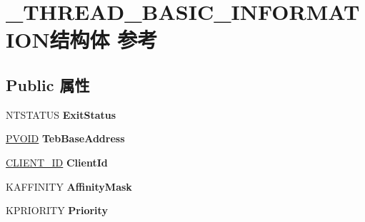 \hypertarget{struct___t_h_r_e_a_d___b_a_s_i_c___i_n_f_o_r_m_a_t_i_o_n}{}\section{\+\_\+\+T\+H\+R\+E\+A\+D\+\_\+\+B\+A\+S\+I\+C\+\_\+\+I\+N\+F\+O\+R\+M\+A\+T\+I\+O\+N结构体 参考}
\label{struct___t_h_r_e_a_d___b_a_s_i_c___i_n_f_o_r_m_a_t_i_o_n}
\subsection*{Public 属性}
\begin{DoxyCompactItemize}
\item 
\mbox{\label{struct___t_h_r_e_a_d___b_a_s_i_c___i_n_f_o_r_m_a_t_i_o_n_a5ef156ce899bb6e306df9f0d38ca80d8}} 
N\+T\+S\+T\+A\+T\+US {\bfseries Exit\+Status}
\item 
\mbox{\label{struct___t_h_r_e_a_d___b_a_s_i_c___i_n_f_o_r_m_a_t_i_o_n_ac16de6379ebcb91729d12edc669e383f}} 
\hyperlink{interfacevoid}{P\+V\+O\+ID} {\bfseries Teb\+Base\+Address}
\item 
\mbox{\label{struct___t_h_r_e_a_d___b_a_s_i_c___i_n_f_o_r_m_a_t_i_o_n_a010d3213d0fa21e09117e1932d671e59}} 
\hyperlink{struct___c_l_i_e_n_t___i_d}{C\+L\+I\+E\+N\+T\+\_\+\+ID} {\bfseries Client\+Id}
\item 
\mbox{\label{struct___t_h_r_e_a_d___b_a_s_i_c___i_n_f_o_r_m_a_t_i_o_n_addfec876033171640efe5f0953c6e1be}} 
K\+A\+F\+F\+I\+N\+I\+TY {\bfseries Affinity\+Mask}
\item 
\mbox{\label{struct___t_h_r_e_a_d___b_a_s_i_c___i_n_f_o_r_m_a_t_i_o_n_a5044831e77b87430a83792036f37fe8d}} 
K\+P\+R\+I\+O\+R\+I\+TY {\bfseries Priority}
\item 
\mbox{\label{struct___t_h_r_e_a_d___b_a_s_i_c___i_n_f_o_r_m_a_t_i_o_n_a55fe89f445ced43930e47d62326e0411}} 

\end{DoxyCompactItemize}

